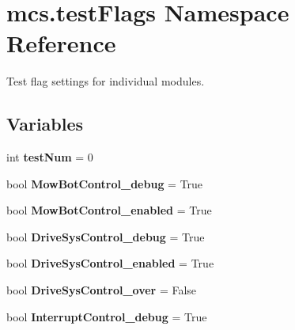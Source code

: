 \hypertarget{namespacemcs_1_1testFlags}{}\section{mcs.\+test\+Flags Namespace Reference}
\label{namespacemcs_1_1testFlags}


Test flag settings for individual modules.  


\subsection*{Variables}
\begin{DoxyCompactItemize}
\item 
\mbox{\label{namespacemcs_1_1testFlags_a5961f8cb6d67374b2425a517ff8c2bb7}} 
int {\bfseries test\+Num} = 0
\item 
\mbox{\label{namespacemcs_1_1testFlags_a30b7cb20f22cb9ebf08011d2b270746c}} 
bool {\bfseries Mow\+Bot\+Control\+\_\+debug} = True
\item 
\mbox{\label{namespacemcs_1_1testFlags_a1b10d95dad3a5722657188acbaf18bee}} 
bool {\bfseries Mow\+Bot\+Control\+\_\+enabled} = True
\item 
\mbox{\label{namespacemcs_1_1testFlags_aadaa121f6b5cad0149f3254a8654b26d}} 
bool {\bfseries Drive\+Sys\+Control\+\_\+debug} = True
\item 
\mbox{\label{namespacemcs_1_1testFlags_a723314e7f8a5b26be14c4b25e9bf2304}} 
bool {\bfseries Drive\+Sys\+Control\+\_\+enabled} = True
\item 
\mbox{\label{namespacemcs_1_1testFlags_aef1e48a9ab69bb753b29d3e6591ca829}} 
bool {\bfseries Drive\+Sys\+Control\+\_\+over} = False
\item 
\mbox{\label{namespacemcs_1_1testFlags_a14e506a3366fcf509a0e934f8e415ba3}} 
bool {\bfseries Interrupt\+Control\+\_\+debug} = True
\item 
\mbox{\label{namespacemcs_1_1testFlags_a577337e55cadb40c18dcb0c42eb0b5b5}} 

\end{DoxyCompactItemize}
